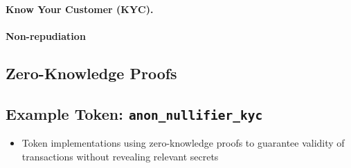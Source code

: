 \paragraph{Know Your Customer (KYC).}


\paragraph{Non-repudiation}


\subsection{Zero-Knowledge Proofs}

\subsection{Example Token: \texttt{anon\_nullifier\_kyc}}

\begin{itemize}
  \item Token implementations using zero-knowledge proofs to guarantee validity of transactions without revealing relevant secrets
\end{itemize}